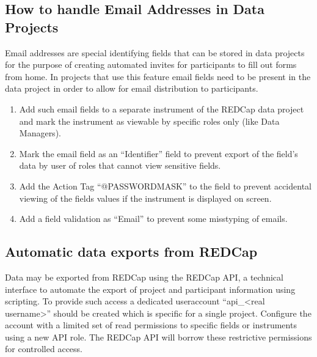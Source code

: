 \documentclass[letterpaper,10pt,english]{sphinxmanual}
\begin{document}
\subsection{How to handle Email Addresses in Data Projects}
\label{\detokenize{ServerAdmin/admin:how-to-handle-email-addresses-in-data-projects}}
\sphinxAtStartPar
Email addresses are special identifying fields that can be stored in data projects for the purpose of creating automated invites for participants to fill out forms from home. In projects that use this feature email fields need to be present in the data project in order to allow for email distribution to participants.
\begin{enumerate}
%
\item {} 
\sphinxAtStartPar
Add such email fields to a separate instrument of the REDCap data project and mark the instrument as viewable by specific roles only (like Data Managers).

\item {} 
\sphinxAtStartPar
Mark the email field as an “Identifier” field to prevent export of the field’s data by user  of roles that cannot view sensitive fields.

\item {} 
\sphinxAtStartPar
Add the Action Tag “@PASSWORDMASK” to the field to prevent accidental viewing of the fields values if the instrument is displayed on screen.

\item {} 
\sphinxAtStartPar
Add a field validation as “Email” to prevent some miss\sphinxhyphen{}typing of emails.

\end{enumerate}


\subsection{Automatic data exports from REDCap}
\label{\detokenize{ServerAdmin/admin:automatic-data-exports-from-redcap}}
\sphinxAtStartPar
Data may be exported from REDCap using the REDCap API, a technical interface to automate the export of project and participant information using scripting. To provide such access a dedicated user\sphinxhyphen{}account “api\_\textless{}real username\textgreater{}” should be created which is specific for a single project. Configure the account with a limited set of read permissions to specific fields or instruments using a new API role. The REDCap API will borrow these restrictive permissions for controlled access.
\end{document}
